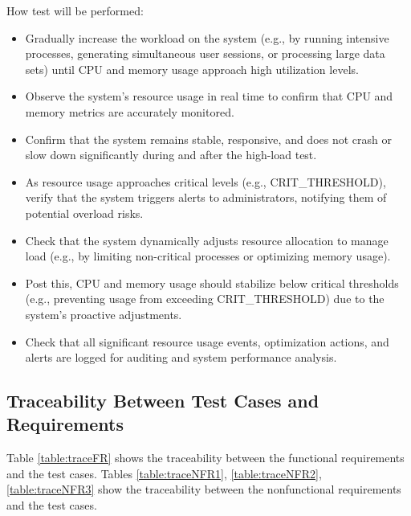 \documentclass[12pt, titlepage]{article}
\begin{document}
\begin{enumerate}
  How test will be performed: 
  \begin{itemize}
    \item Gradually increase the workload on the system (e.g., by running
    intensive processes, generating simultaneous user sessions, or processing
    large data sets) until CPU and memory usage approach high utilization
    levels.
    \item  Observe the system's resource usage in real time to confirm that CPU
    and memory metrics are accurately monitored.
    \item Confirm that the system remains stable, responsive, and does not crash
    or slow down significantly during and after the high-load test.
    \item As resource usage approaches critical levels (e.g., CRIT\_THRESHOLD),
    verify that the system triggers alerts to administrators, notifying them of
    potential overload risks.
    \item Check that the system dynamically adjusts resource allocation to
    manage load (e.g., by limiting non-critical processes or optimizing memory
    usage).
    \item Post this, CPU and memory usage should stabilize below critical
    thresholds (e.g., preventing usage from exceeding CRIT\_THRESHOLD) due to
    the system's proactive adjustments.
    \item Check that all significant resource usage events, optimization
    actions, and alerts are logged for auditing and system performance analysis.
  \end{itemize}

\end{enumerate}

\subsection{Traceability Between Test Cases and Requirements}

Table \ref{table:traceFR} shows the traceability between the functional
requirements and the test cases. Tables \ref{table:traceNFR1},
\ref{table:traceNFR2}, \ref{table:traceNFR3} show the traceability between the
nonfunctional requirements and the test cases.
\end{document}
